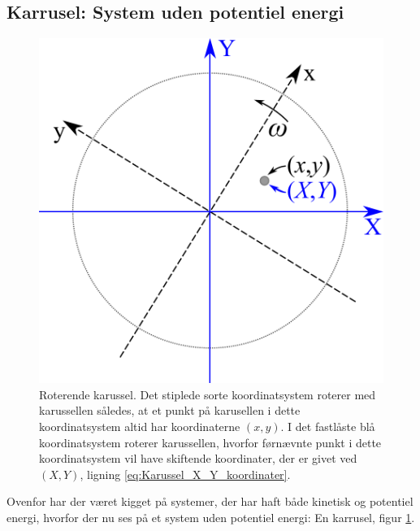 \subsection{Karrusel: System uden potentiel energi} \label{sec:Karrusel}
\begin{figure}
	\centering
	\includegraphics[width=0.4\columnwidth]{Analytisk-Mekanik/Karussel.pdf}
	\caption{Roterende karussel. Det stiplede sorte koordinatsystem roterer med karussellen således, at et punkt på karusellen i dette koordinatsystem altid har koordinaterne $(x,y)$. I det fastlåste blå koordinatsystem roterer karussellen, hvorfor førnævnte punkt i dette koordinatsystem vil have skiftende koordinater, der er givet ved $(X,Y)$, ligning \eqref{eq:Karussel_X_Y_koordinater}.}
	\label{fig:Karussel}
\end{figure}

Ovenfor har der været kigget på systemer, der har haft både kinetisk og potentiel energi, hvorfor der nu ses på et system uden potentiel energi: En karrusel, figur \ref{fig:Karussel}.

